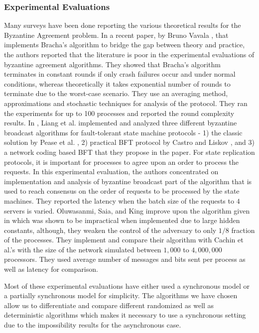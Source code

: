 \subsubsection{Experimental Evaluations}
Many surveys have been done reporting the various theoretical results for the Byzantine Agreement problem. In a recent paper, by Bruno Vavala \cite{VN12}, that implements Bracha's algorithm \cite{Bracha84} to bridge the gap between theory and practice, the authors reported that the literature is poor in the experimental evaluations of byzantine agreement algorithms. They showed that Bracha's algorithm terminates in constant rounds if only crash failures occur and under normal conditions, whereas theoretically it takes exponential number of rounds to terminate due to the worst-case scenario. They use an averaging method, approximations and stochastic techniques for analysis of the protocol. They ran the experiments for up to 100 processes and reported the round complexity results. In \cite{LSV12}, Liang et al. implemented and analyzed three different byzantine broadcast algorithms for fault-tolerant state machine protocols - 1) the classic solution by Pease et al. \cite{PeaseSL80}, 2) practical BFT protocol by Castro and Liskov \cite{CL02}, and 3) a network coding based BFT that they propose in the paper. For state replication protocols, it is important for processes to agree upon an order to process the requests. In this experimental evaluation, the authors concentrated on implementation and analysis of byzantine broadcast part of the algorithm that is used to reach consensus on the order of requests to be processed by the state machines. They reported the latency when the batch size of the requests to $4$ servers is varied. Oluwasanmi, Saia, and King \cite{OSK10} improve upon the algorithm given in \cite{KS09} which was shown to be impractical when implemented due to large hidden constants, although, they weaken the control of the adversary to only $1/8$ fraction of the processes. They implement and compare their algorithm with Cachin et al.'s \cite{CKS05} with the size of the network simulated between $1,000$ to $4,000,000$ processors. They used average number of messages and bits sent per process as well as latency for comparison.

Most of these experimental evaluations have either used a synchronous model or a partially synchronous model for simplicity. The algorithms we have chosen allow us to differentiate and compare different randomized as well as deterministic algorithms which makes it necessary to use a synchronous setting due to the impossibility results for the asynchronous case. 

